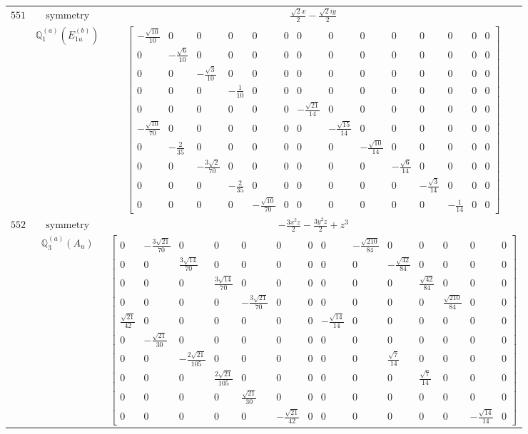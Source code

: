 \documentclass[fleqn,8pt,landscape]{jsarticle}
\begin{document}
\begin{longtable}{ccc}
$ 551 $ & $ \text{symmetry} $ & $ \frac{\sqrt{2} x}{2} - \frac{\sqrt{2} i y}{2} $ \\
$  $ & $ \mathbb{Q}_{1}^{(a)}(E_{1u}^{(b)}) $ & $ \begin{bmatrix} - \frac{\sqrt{10}}{10} & 0 & 0 & 0 & 0 & 0 & 0 & 0 & 0 & 0 & 0 & 0 & 0 & 0 \\ 0 & - \frac{\sqrt{6}}{10} & 0 & 0 & 0 & 0 & 0 & 0 & 0 & 0 & 0 & 0 & 0 & 0 \\ 0 & 0 & - \frac{\sqrt{3}}{10} & 0 & 0 & 0 & 0 & 0 & 0 & 0 & 0 & 0 & 0 & 0 \\ 0 & 0 & 0 & - \frac{1}{10} & 0 & 0 & 0 & 0 & 0 & 0 & 0 & 0 & 0 & 0 \\ 0 & 0 & 0 & 0 & 0 & 0 & - \frac{\sqrt{21}}{14} & 0 & 0 & 0 & 0 & 0 & 0 & 0 \\ - \frac{\sqrt{10}}{70} & 0 & 0 & 0 & 0 & 0 & 0 & - \frac{\sqrt{15}}{14} & 0 & 0 & 0 & 0 & 0 & 0 \\ 0 & - \frac{2}{35} & 0 & 0 & 0 & 0 & 0 & 0 & - \frac{\sqrt{10}}{14} & 0 & 0 & 0 & 0 & 0 \\ 0 & 0 & - \frac{3 \sqrt{2}}{70} & 0 & 0 & 0 & 0 & 0 & 0 & - \frac{\sqrt{6}}{14} & 0 & 0 & 0 & 0 \\ 0 & 0 & 0 & - \frac{2}{35} & 0 & 0 & 0 & 0 & 0 & 0 & - \frac{\sqrt{3}}{14} & 0 & 0 & 0 \\ 0 & 0 & 0 & 0 & - \frac{\sqrt{10}}{70} & 0 & 0 & 0 & 0 & 0 & 0 & - \frac{1}{14} & 0 & 0 \end{bmatrix} $ \\ \hline
$ 552 $ & $ \text{symmetry} $ & $ - \frac{3 x^{2} z}{2} - \frac{3 y^{2} z}{2} + z^{3} $ \\
$  $ & $ \mathbb{Q}_{3}^{(a)}(A_{u}) $ & $ \begin{bmatrix} 0 & - \frac{3 \sqrt{21}}{70} & 0 & 0 & 0 & 0 & 0 & 0 & - \frac{\sqrt{210}}{84} & 0 & 0 & 0 & 0 & 0 \\ 0 & 0 & \frac{3 \sqrt{14}}{70} & 0 & 0 & 0 & 0 & 0 & 0 & - \frac{\sqrt{42}}{84} & 0 & 0 & 0 & 0 \\ 0 & 0 & 0 & \frac{3 \sqrt{14}}{70} & 0 & 0 & 0 & 0 & 0 & 0 & \frac{\sqrt{42}}{84} & 0 & 0 & 0 \\ 0 & 0 & 0 & 0 & - \frac{3 \sqrt{21}}{70} & 0 & 0 & 0 & 0 & 0 & 0 & \frac{\sqrt{210}}{84} & 0 & 0 \\ \frac{\sqrt{21}}{42} & 0 & 0 & 0 & 0 & 0 & 0 & - \frac{\sqrt{14}}{14} & 0 & 0 & 0 & 0 & 0 & 0 \\ 0 & - \frac{\sqrt{21}}{30} & 0 & 0 & 0 & 0 & 0 & 0 & 0 & 0 & 0 & 0 & 0 & 0 \\ 0 & 0 & - \frac{2 \sqrt{21}}{105} & 0 & 0 & 0 & 0 & 0 & 0 & \frac{\sqrt{7}}{14} & 0 & 0 & 0 & 0 \\ 0 & 0 & 0 & \frac{2 \sqrt{21}}{105} & 0 & 0 & 0 & 0 & 0 & 0 & \frac{\sqrt{7}}{14} & 0 & 0 & 0 \\ 0 & 0 & 0 & 0 & \frac{\sqrt{21}}{30} & 0 & 0 & 0 & 0 & 0 & 0 & 0 & 0 & 0 \\ 0 & 0 & 0 & 0 & 0 & - \frac{\sqrt{21}}{42} & 0 & 0 & 0 & 0 & 0 & 0 & - \frac{\sqrt{14}}{14} & 0 \end{bmatrix} $ \\ \hline

\end{longtable}
\end{document}
